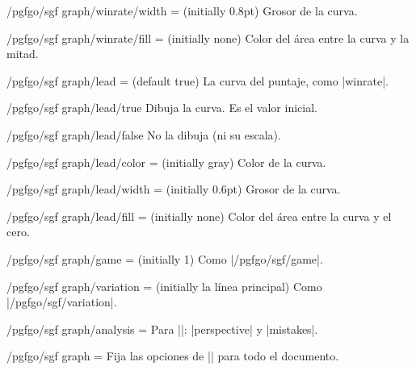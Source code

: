 \begin{key}{/pgfgo/sgf graph/winrate/width =  (initially 0.8pt)}
	Grosor de la curva.
\end{key}

\begin{key}{/pgfgo/sgf graph/winrate/fill =  (initially none)}
	Color del área entre la curva y la mitad.

	\begin{codeexample}[]
	\end{codeexample}
\end{key}

\begin{key}{/pgfgo/sgf graph/lead =  (default true)}
	La curva del puntaje, como |winrate|.
\end{key}

\begin{stylekey}{/pgfgo/sgf graph/lead/true}
	Dibuja la curva. Es el valor inicial.
\end{stylekey}

\begin{stylekey}{/pgfgo/sgf graph/lead/false}
	No la dibuja (ni su escala).
\end{stylekey}

\begin{key}{/pgfgo/sgf graph/lead/color =  (initially gray)}
	Color de la curva.
\end{key}

\begin{key}{/pgfgo/sgf graph/lead/width =  (initially 0.6pt)}
	Grosor de la curva.
\end{key}

\begin{key}{/pgfgo/sgf graph/lead/fill =  (initially none)}
	Color del área entre la curva y el cero.
\end{key}

\begin{key}{/pgfgo/sgf graph/game =  (initially 1)}
	Como |/pgfgo/sgf/game|.
\end{key}

\begin{key}{/pgfgo/sgf graph/variation =  (initially la línea principal)}
	Como |/pgfgo/sgf/variation|.
\end{key}

\begin{key}{/pgfgo/sgf graph/analysis = }
	Para |\sgfgraph|: |perspective| y |mistakes|.
\end{key}

\begin{key}{/pgfgo/sgf graph = }
	Fija las opciones de |\sgfgraph| para todo el documento.
\end{key}
